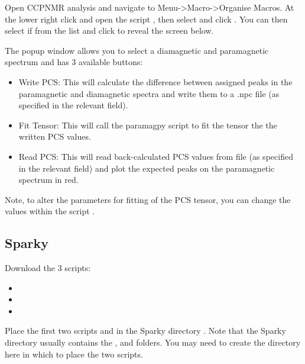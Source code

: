 \documentclass[a4paper,10pt,english]{sphinxmanual}
\begin{document}
Open CCPNMR analysis and navigate to Menu-\textgreater{}Macro-\textgreater{}Organise Macros. At the lower right click  and open the script , then select  and click . You can then select if from the list and click  to reveal the screen below.

\noindent{}

The popup window allows you to select a diamagnetic and paramagnetic spectrum and has 3 available buttons:
\begin{itemize}
\item {} 
Write PCS: This will calculate the difference between assigned peaks in the paramagnetic and diamagnetic spectra and write them to a .npc file (as specified in the relevant field).

\item {} 
Fit Tensor: This will call the paramagpy script  to fit the tensor the the written PCS values.

\item {} 
Read PCS: This will read back-calculated PCS values from file (as specified in the relevant field) and plot the expected peaks on the paramagnetic spectrum in red.

\end{itemize}

Note, to alter the parameters for fitting of the PCS tensor, you can change the values within the script .


\subsection{Sparky}
\label{\detokenize{nmr_software_macros/index:sparky}}
Download the 3 scripts:
\begin{itemize}
\item {} 

\item {} 

\item {} 

\end{itemize}

Place the first two scripts  and  in the Sparky directory . Note that the Sparky directory usually contains the ,  and  folders. You may need to create the  directory here in which to place the two scripts.
\end{document}
